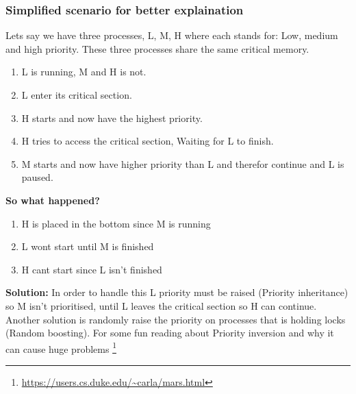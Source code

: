 \documentclass[../../../main.tex]{subfiles}
\begin{document}
\subsubsection{Simplified scenario for better explaination}
Lets say we have three processes, L, M, H where each stands for: Low, medium and high priority. These three processes share the same critical memory.
\begin{enumerate}
    \item L is running, M and H is not.
    \item L enter its critical section.
    \item H starts and now have the highest priority.
    \item H tries to access the critical section, Waiting for L to finish.
    \item M starts and now have higher priority than L and therefor continue and L is paused.
\end{enumerate}
\textbf{So what happened?}
\begin{enumerate}
    \item  H is placed in the bottom since M is running
    \item  L wont start until M is finished
    \item H cant start since L isn't finished
\end{enumerate}
\textbf{Solution:} In order to handle this L priority must be raised (Priority inheritance) so M isn't prioritised, until L leaves the critical section so H can continue. Another solution is randomly raise the priority on processes that is holding locks (Random boosting).
\newline\newline
For some fun reading about Priority inversion and why it can cause huge problems \footnote{\url{https://users.cs.duke.edu/~carla/mars.html}}
\end{document}
